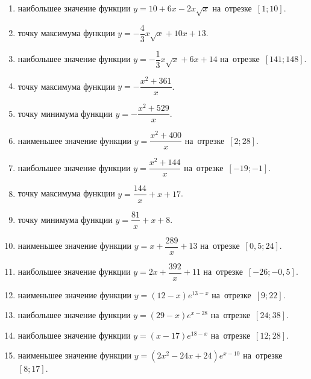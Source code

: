 \documentclass[a4paper,10pt]{article}
\begin{document}
\begin{enumerate}
\item {} наибольшее значение функции $y=10+6x -2x\sqrt{x}$ на~отрезке~$\left[1;10\right]$.

\item {} точку максимума функции $y=-\dfrac{4}{3}x\sqrt{x} +10x+13$.

\item {} наибольшее значение функции $y=-\dfrac{1}{3}x\sqrt{x} +6x+14$ на~отрезке~$\left[141;148\right]$.

\item {} точку максимума функции $y=-\dfrac{x^2 +361}{x}$.

\item {} точку минимума функции $y=-\dfrac{x^2 +529}{x}$.

\item {} наименьшее значение функции $y=\dfrac{x^2 +400}{x}$ на~отрезке~$\left[2;28\right]$.

\item {} наибольшее значение функции $y=\dfrac{x^2 +144}{x}$ на~отрезке~$\left[-19;-1\right]$.

\item {} точку максимума функции $y=\dfrac{144}{x} +x+17$.

\item {} точку минимума функции $y=\dfrac{81}{x} +x+8$.

\item {} наименьшее значение функции $y=x+\dfrac{289}{x} +13$ на~отрезке~$\left[0,5;24\right]$.

\item {} наибольшее значение функции $y=2x+\dfrac{392}{x} +11$ на~отрезке~$\left[-26;-0,5\right]$.

\item {} наименьшее значение функции $y=\left(12-x\right)e^{13-x}$ на~отрезке~$\left[9;22\right]$.

\item {} наибольшее значение функции $y=\left(29-x\right)e^{x-28}$ на~отрезке~$\left[24;38\right]$.

\item {} наибольшее значение функции $y=\left(x-17\right)e^{18-x}$ на~отрезке~$\left[12;28\right]$.

\item {} наименьшее значение функции $y=\left(2x^2 -24x +24\right)e^{x -10}$ на~отрезке~$\left[8;17\right]$.


\end{enumerate}
\end{document}
